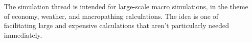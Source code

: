 The simulation thread is intended for large-scale macro simulations, in the theme of economy, weather, and macropathing calculations. The idea is one of facilitating large and expensive calculations that aren't particularly needed immediately.